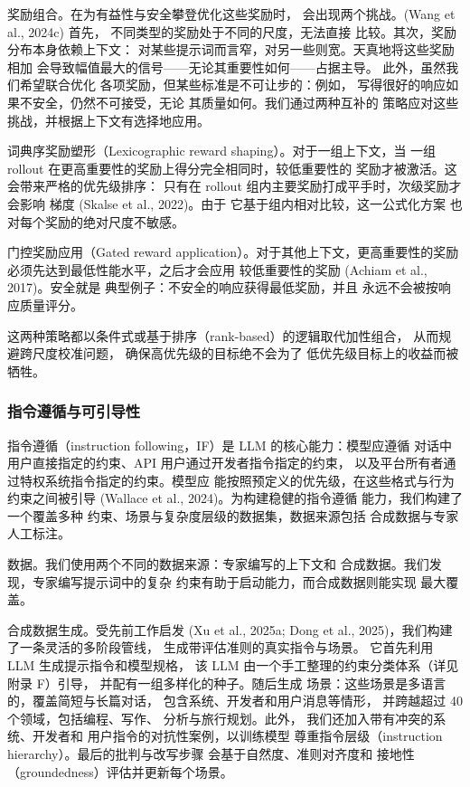 \documentclass[
  10
]{article}
\begin{document}
奖励组合。在为有益性与安全攀登优化这些奖励时，
会出现两个挑战。(Wang et al., 2024c) 首先，
不同类型的奖励处于不同的尺度，无法直接
比较。其次，奖励分布本身依赖上下文：
对某些提示词而言窄，对另一些则宽。天真地将这些奖励相加
会导致幅值最大的信号——无论其重要性如何——占据主导。
此外，虽然我们希望联合优化
各项奖励，但某些标准是不可让步的：例如，
写得很好的响应如果不安全，仍然不可接受，无论
其质量如何。我们通过两种互补的
策略应对这些挑战，并根据上下文有选择地应用。

词典序奖励塑形（Lexicographic reward shaping）。对于一组上下文，当
一组 rollout 在更高重要性的奖励上得分完全相同时，较低重要性的
奖励才被激活。这会带来严格的优先级排序：
只有在 rollout 组内主要奖励打成平手时，次级奖励才会影响
梯度 (Skalse et al., 2022)。由于
它基于组内相对比较，这一公式化方案
也对每个奖励的绝对尺度不敏感。

门控奖励应用（Gated reward application）。对于其他上下文，更高重要性的奖励
必须先达到最低性能水平，之后才会应用
较低重要性的奖励 (Achiam et al., 2017)。安全就是
典型例子：不安全的响应获得最低奖励，并且
永远不会被按响应质量评分。



这两种策略都以条件式或基于排序（rank-based）的逻辑取代加性组合，
从而规避跨尺度校准问题，
确保高优先级的目标绝不会为了
低优先级目标上的收益而被牺牲。

\subsubsection{指令遵循与可引导性}\label{instruction-following-and-steerability}

指令遵循（instruction following，IF）是 LLM 的核心能力：模型应遵循
对话中用户直接指定的约束、API 用户通过开发者指令指定的约束，
以及平台所有者通过特权系统指令指定的约束。模型应
能按照预定义的优先级，在这些格式与行为
约束之间被引导 (Wallace et al., 2024)。为构建稳健的指令遵循
能力，我们构建了一个覆盖多种
约束、场景与复杂度层级的数据集，数据来源包括
合成数据与专家人工标注。

数据。我们使用两个不同的数据来源：专家编写的上下文和
合成数据。我们发现，专家编写提示词中的复杂
约束有助于启动能力，而合成数据则能实现
最大覆盖。

合成数据生成。受先前工作启发 (Xu et al., 2025a;
Dong et al., 2025)，我们构建了一条灵活的多阶段管线，
生成带评估准则的真实指令与场景。
它首先利用 LLM 生成提示指令和模型规格，
该 LLM 由一个手工整理的约束分类体系（详见附录 F）引导，
并配有一组多样化的种子。随后生成
场景：这些场景是多语言的，覆盖简短与长篇对话，
包含系统、开发者和用户消息等情形，
并跨越超过 40 个领域，包括编程、写作、
分析与旅行规划。此外，
我们还加入带有冲突的系统、开发者和
用户指令的对抗性案例，以训练模型
尊重指令层级（instruction hierarchy）。最后的批判与改写步骤
会基于自然度、准则对齐度和
接地性（groundedness）评估并更新每个场景。
\end{document}
